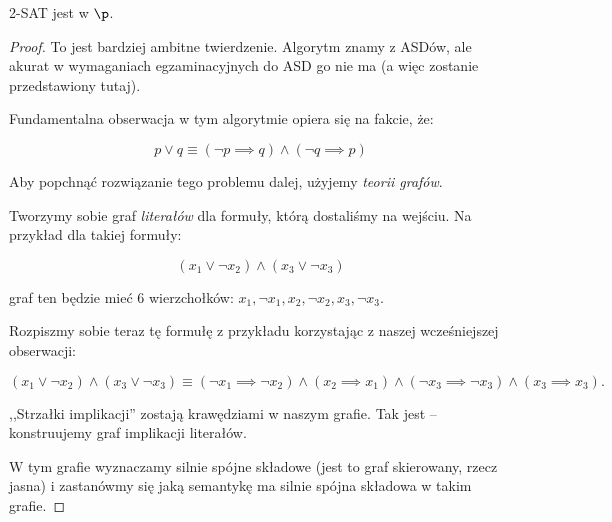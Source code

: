 \begin{theorem}
2-SAT jest w \(\p\).
\end{theorem}
\begin{proof}
To jest bardziej ambitne twierdzenie. Algorytm znamy z ASDów, ale akurat w wymaganiach egzaminacyjnych do ASD go nie ma (a więc zostanie przedstawiony tutaj). 

Fundamentalna obserwacja w tym algorytmie opiera się na fakcie, że:

\[ 
p \lor q \equiv (\neg p \implies q) \land (\neg q \implies p)
\]

Aby popchnąć rozwiązanie tego problemu dalej, użyjemy \textit{teorii grafów}.

Tworzymy sobie graf \textit{literałów} dla formuły, którą dostaliśmy na wejściu. Na przykład dla takiej formuły:

\[
    (x_1 \lor \neg x_2) \land (x_3 \lor \neg x_3)
\]

graf ten będzie mieć 6 wierzchołków: \(x_1, \neg x_1, x_2, \neg x_2, x_3, \neg x_3\).

Rozpiszmy sobie teraz tę formułę z przykładu korzystając z naszej wcześniejszej obserwacji:

\[
    (x_1 \lor \neg x_2) \land (x_3 \lor \neg x_3) \equiv (\neg x_1 \implies \neg x_2) \land (x_2 \implies x_1) \land (\neg x_3 \implies \neg x_3) \land (x_3 \implies x_3).
\]

,,Strzałki implikacji'' zostają krawędziami w naszym grafie. Tak jest -- konstruujemy graf implikacji literałów. 

\begin{center}

\end{center}

W tym grafie wyznaczamy silnie spójne składowe (jest to graf skierowany, rzecz jasna) i zastanówmy się jaką semantykę ma silnie spójna składowa w takim grafie. 


\end{proof}

